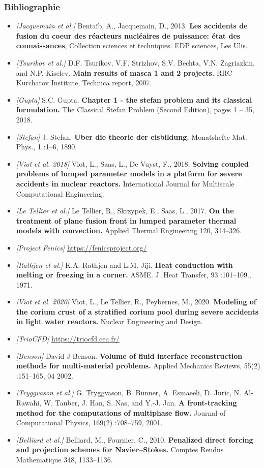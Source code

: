 \documentclass{beamer}
\newcommand{\bib}[1]{{\color{cea_texte!80}\tiny\textit{[#1]}}}
\begin{document}
\begin{frame}[noframenumbering]
    \frametitle{Bibliographie}
	\tiny
\begin{itemize}
	\item \bib{Jacquemain et al.} Bentaïb, A., Jacquemain, D., 2013. \textbf{Les accidents de fusion du coeur des réacteurs nucléaires de puissance: état des connaissances}, Collection sciences et techniques. EDP sciences, Les Ulis.

	\item \bib{Tsurikov et al.} D.F. Tsurikov, V.F. Strizhov, S.V. Bechta, V.N. Zagriazkin, and N.P. Kiselev. \textbf{Main results of masca 1 and 2 projects.} RRC Kurchatov Institute, Technica report, 2007.
	\item \bib{Gupta} S.C. Gupta. \textbf{Chapter 1 - the stefan problem and its classical formulation.} The Classical Stefan Problem (Second Edition), pages 1 – 35, 2018.
	\item \bib{Stefan} J. Stefan. \textbf{Uber die theorie der eisbildung.} Monatshefte Mat. Phys., 1 :1–6, 1890.
	\item \bib{Viot et al. 2018} Viot, L., Saas, L., De Vuyst, F., 2018. \textbf{Solving coupled problems of lumped parameter models in a platform for severe accidents in nuclear reactors.} International Journal for Multiscale Computational Engineering.
	\item \bib{Le Tellier et al.} Le Tellier, R., Skrzypek, E., Saas, L., 2017. \textbf{On the treatment of plane fusion front in lumped parameter thermal models with convection.} Applied Thermal Engineering 120, 314–326.
	\item \bib{Project Fenics} \url{https://fenicsproject.org/}
	\item \bib{Rathjen et al.} K.A. Rathjen and L.M. Jiji. \textbf{Heat conduction with melting or freezing in a corner.}
ASME. J. Heat Transfer, 93 :101–109., 1971.
	\item \bib{Viot et al. 2020} Viot, L., Le Tellier, R., Peybernes, M., 2020. \textbf{Modeling of the corium crust of a stratified corium pool during severe accidents in light water reactors.} Nuclear Engineering and Design.
	\item \bib{TrioCFD} \url{https://triocfd.cea.fr/}
	\item \bib{Benson} David J Benson. \textbf{Volume of fluid interface reconstruction methods for multi-material
problems.} Applied Mechanics Reviews, 55(2) :151–165, 04 2002.
	\item \bib{Tryggvason et al.} G. Tryggvason, B. Bunner, A. Esmaeeli, D. Juric, N. Al-Rawahi, W. Tauber, J. Han,
S. Nas, and Y.-J. Jan. \textbf{A front-tracking method for the computations of multiphase flow.} Journal of Computational Physics, 169(2) :708–759, 2001.
	\item \bib{Belliard et al.} Belliard, M., Fournier, C., 2010. \textbf{Penalized direct forcing and projection schemes for Navier–Stokes.} Comptes Rendus Mathematique 348, 1133–1136.

\end{itemize}


\end{frame}
\end{document}
